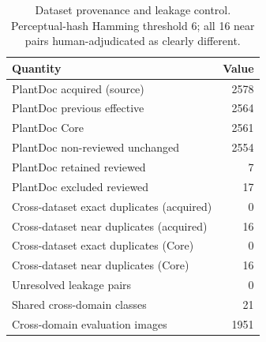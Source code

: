 \begin{table}[htbp]
\caption{Dataset provenance and leakage control. Perceptual-hash Hamming threshold 6; all 16 near pairs human-adjudicated as clearly different.}
\label{tab:dataset-provenance}
\begin{tabular}{lr}
\toprule
Quantity & Value \\
\midrule
PlantDoc acquired (source) & 2578 \\
PlantDoc previous effective & 2564 \\
PlantDoc Core & 2561 \\
PlantDoc non-reviewed unchanged & 2554 \\
PlantDoc retained reviewed & 7 \\
PlantDoc excluded reviewed & 17 \\
Cross-dataset exact duplicates (acquired) & 0 \\
Cross-dataset near duplicates (acquired) & 16 \\
Cross-dataset exact duplicates (Core) & 0 \\
Cross-dataset near duplicates (Core) & 16 \\
Unresolved leakage pairs & 0 \\
Shared cross-domain classes & 21 \\
Cross-domain evaluation images & 1951 \\
\bottomrule
\end{tabular}
\end{table}
